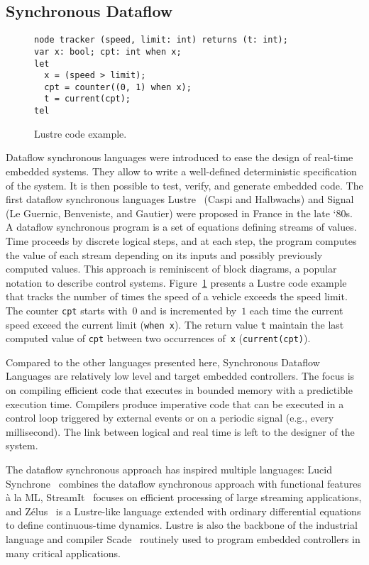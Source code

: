 \subsection{Synchronous Dataflow}\label{sec:sdf} %

\begin{figure}[!h]
\begin{lstlisting}
node tracker (speed, limit: int) returns (t: int);
var x: bool; cpt: int when x;
let
  x = (speed > limit);
  cpt = counter((0, 1) when x);
  t = current(cpt);
tel
\end{lstlisting}
\vspace*{-4mm}
\caption{\label{fig:lustre} Lustre code example.}
\end{figure}

Dataflow synchronous languages were introduced to ease the design of
real-time embedded systems. They allow to write a well-defined
deterministic specification of the system. It is then possible to
test, verify, and generate embedded code.
The first data\-flow synchronous languages Lustre~\cite{lustre_1987}
(Caspi and Halbwachs) and Signal~\cite{signal_1991} (Le Guernic,
Benveniste, and Gautier) were proposed in France in the late `80s.
A dataflow synchronous program is a set of equations defining streams
of values. Time proceeds by discrete logical steps, and at each step,
the program computes the value of each stream depending on its inputs
and possibly previously computed values.
This approach is reminiscent of block diagrams, a popular notation to
describe control systems.
Figure~\ref{fig:lustre} presents a Lustre code example that tracks the
number of times the speed of a vehicle exceeds the speed limit. The
counter \lstinline{cpt} starts with~$0$ and is incremented by~$1$ each
time the current speed exceed the current limit (\lstinline{when x}).
The return value \lstinline{t} maintain the last computed value
of \lstinline{cpt} between two occurrences of~\lstinline{x}
(\lstinline{current(cpt)}).


Compared to the other languages presented here, Synchronous Dataflow
Languages are relatively low level and target embedded
controllers. The focus is on compiling efficient code that executes
in bounded memory with a predictible execution time. Compilers produce
imperative code that can be executed in a control loop triggered by
external events or on a periodic signal (e.g., every millisecond). The
link between logical and real time is left to the designer of the
system.


The dataflow synchronous approach has inspired
multiple languages: Lucid Synchrone~\cite{lucid_2006} combines the
dataflow synchronous approach with functional features \`a la ML,
StreamIt~\cite{streamit_2002} focuses on efficient processing of large
streaming applications, and Z\'elus~\cite{zelus_2013} is a Lustre-like
language extended with ordinary differential equations to define
continuous-time dynamics. Lustre is also the backbone of the
industrial language and compiler Scade~\cite{scade_2017} routinely
used to program embedded controllers in many critical applications.
